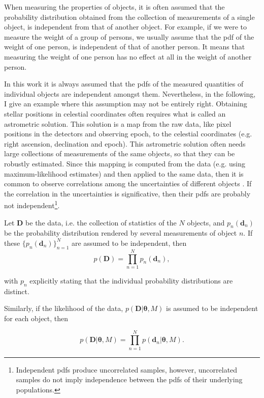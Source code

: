 When measuring the properties of objects, it is often assumed that the probability distribution obtained from the collection of measurements of a single object, is independent from that of another object. For example, if we were to measure the weight of a group of persons, we usually assume that the \gls{pdf} of the weight of one person, is independent of that of another person. It means that measuring the weight of one person has no effect at all in the weight of another person.


In this work it is always assumed that the \glspl{pdf}  of the measured quantities of individual objects are independent amongst them. Nevertheless, in the following, I give an example where this assumption may not be entirely right. Obtaining stellar positions in celestial coordinates often requires what is called an astrometric solution. This solution is a map from the raw data, like pixel positions in the detectors and observing epoch, to the celestial coordinates (e.g. right ascension, declination and epoch). This astrometric solution often needs large collections of measurements of the same objects, so that they can be robustly estimated. Since this mapping is computed from the data (e.g. using maximum-likelihood estimates) and then applied to the same data, then it is common to observe correlations among the uncertainties of different objects \cite[see for example][]{2010IAUS..261..320H,2017A&A...601A..19G}. If the correlation in the uncertainties is significative, then their \glspl{pdf}  are probably not independent\footnote{Independent \glspl{pdf}  produce uncorrelated samples, however, uncorrelated samples do not imply independence between the \glspl{pdf}  of their underlying populations.}.  


Let $\mathbf{D}$ be the data, i.e. the collection of statistics of the $N$ objects, and $p_n(\mathbf{d}_n)$ be the probability distribution rendered by several measurements of object $n$. If these $\{p_n(\mathbf{d}_n)\}_{n=1}^N$ are assumed to be independent, then
\begin{equation}
\label{eq:independence}
 p(\mathbf{D}) = \prod_{n=1}^N p_n(\mathbf{d}_n),
\end{equation}

 with $p_n$ explicitly stating that the individual probability distributions are distinct. 
 
Similarly, if the likelihood of the data, $p(\mathbf{D}|\boldsymbol{\theta},M)$ is assumed to be independent for each object, then

\begin{equation}
\label{eq:lik_datum}
 p(\mathbf{D}|\boldsymbol{\theta},M) = \prod_{n=1}^N p(\mathbf{d}_n|\boldsymbol{\theta},M).
\end{equation}


